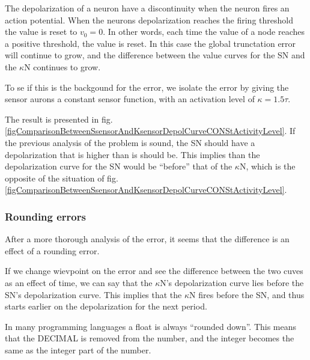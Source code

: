 The depolarization of a neuron have a discontinuity when the neuron fires an action potential. 
When the neurons depolarization reaches the firing threshold the value is reset to $v_0 = 0$.
In other words, each time the value of a node reaches a positive threshold, the value is reset.
In this case the global trunctation error will continue to grow, and the difference between the value curves for the SN and the $\kappa$N continues to grow. %

To se if this is the backgound for the error, we isolate the error by giving the sensor aurons a constant sensor function, with an activation level of $\kappa = 1.5 \tau$.

The result is presented in fig. \ref{figComparisonBetweenSsensorAndKsensorDepolCurveCONStActivityLevel}. %
If the previous analysis of the problem is sound, the SN should have a depolarization that is higher than is should be.
This implies than the depolarization curve for the SN would be ``before'' that of the $\kappa$N, which is the opposite of the situation of fig. \ref{figComparisonBetweenSsensorAndKsensorDepolCurveCONStActivityLevel}.

\subsubsection{Rounding errors}
After a more thorough analysis of the error, it seems that the difference is an effect of a rounding error.

If we change wievpoint on the error and see the difference between the two cuves as an effect of time, we can say that the $\kappa$N's depolarization curve lies before the SN's depolarization curve.
This implies that the $\kappa$N fires before the SN, and thus starts earlier on the depolarization for the next period.

In many programming languages a float is always ``rounded down''. This means that the DECIMAL %
	is removed from the number, and the integer becomes the same as the integer part of the number.

